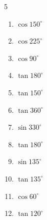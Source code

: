\begin{multicols}{5}
\begin{enumerate}

  \item $\displaystyle \cos{150^\circ}$


  \item $\displaystyle \cos{225^\circ}$


  \item $\displaystyle \cos{90^\circ}$

        \phantom{$\displaystyle =0$}

  \item $\displaystyle \tan{180^\circ}$

        \phantom{$\displaystyle =0$}

  \item $\displaystyle \tan{150^\circ}$


\columnbreak %

  \item $\displaystyle \tan{360^\circ}$

        \phantom{$\displaystyle =0$}

  \item $\displaystyle \sin{330^\circ}$


  \item $\displaystyle \tan{180^\circ}$

        \phantom{$\displaystyle =0$}

  \item $\displaystyle \sin{135^\circ}$


  \item $\displaystyle \tan{135^\circ}$

        \phantom{$\displaystyle =-1$}

  \item $\displaystyle \cos{60^\circ}$


  \item $\displaystyle \tan{120^\circ}$



\end{enumerate}
\end{multicols}
